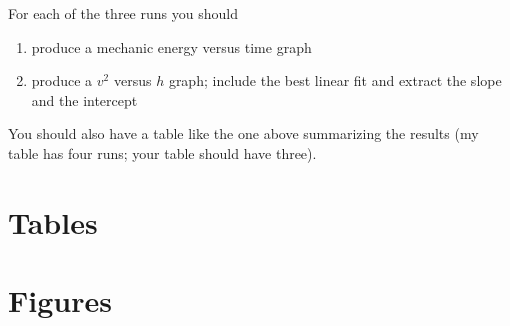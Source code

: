 For each of the three runs you should
\begin{enumerate}
    \item produce a mechanic energy versus time graph
    \item produce a $v^{2}$ versus $h$ graph; include the best linear fit and extract the slope and the intercept
\end{enumerate}
You should also have a table like the one above summarizing the results (my table has four runs; your table should have three).
\newpage
\section{Tables}
\FloatBarrier
\newpage
\section{Figures}
